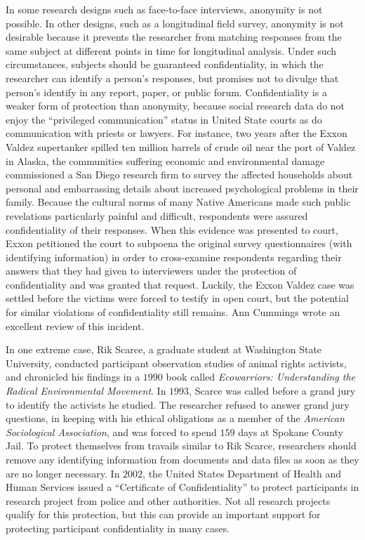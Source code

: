 In some research designs such as face-to-face interviews, anonymity is not possible. In other designs, such as a longitudinal field survey, anonymity is not desirable because it prevents the researcher from matching responses from the same subject at different points in time for longitudinal analysis. Under such circumstances, subjects should be guaranteed confidentiality, in which the researcher can identify a person's responses, but promises not to divulge that person's identify in any report, paper, or public forum. Confidentiality is a weaker form of protection than anonymity, because social research data do not enjoy the ``privileged communication'' status in United State courts as do communication with priests or lawyers. For instance, two years after the Exxon Valdez supertanker spilled ten million barrels of crude oil near the port of Valdez in Alaska, the communities suffering economic and environmental damage commissioned a San Diego research firm to survey the affected households about personal and embarrassing details about increased psychological problems in their family. Because the cultural norms of many Native Americans made such public revelations particularly painful and difficult, respondents were assured confidentiality of their responses. When this evidence was presented to court, Exxon petitioned the court to subpoena the original survey questionnaires (with identifying information) in order to cross-examine respondents regarding their answers that they had given to interviewers under the protection of confidentiality and was granted that request. Luckily, the Exxon Valdez case was settled before the victims were forced to testify in open court, but the potential for similar violations of confidentiality still remains. Ann Cummings\cite{cummings1992exxon} wrote an excellent review of this incident.

In one extreme case, Rik Scarce, a graduate student at Washington State University, conducted participant observation studies of animal rights activists, and chronicled his findings in a $ 1990 $ book called \textit{Ecowarriors: Understanding the Radical Environmental Movement}\cite{scarce2016eco}. In $ 1993 $, Scarce was called before a grand jury to identify the activists he studied. The researcher refused to answer grand jury questions, in keeping with his ethical obligations as a member of the \textit{American Sociological Association}, and was forced to spend $ 159 $ days at Spokane County Jail. To protect themselves from travails similar to Rik Scarce, researchers should remove any identifying information from documents and data files as soon as they are no longer necessary. In $ 2002 $, the United States Department of Health and Human Services issued a ``Certificate of Confidentiality'' to protect participants in research project from police and other authorities. Not all research projects qualify for this protection, but this can provide an important support for protecting participant confidentiality in many cases.


